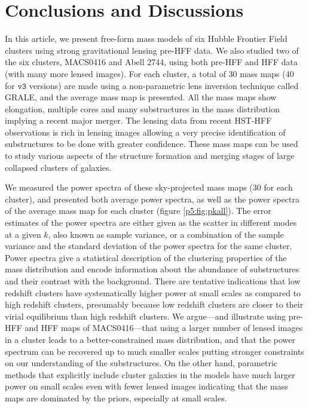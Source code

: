 \documentclass[
  11pt,
  twoside,
  openright,
  titlepage,
  headings=optiontoheadandtoc
]{scrbook}
\begin{document}

\section{Conclusions and Discussions}\label{p5:sec:discussion}

In this article, we present free-form mass models of six Hubble Frontier Field
clusters using strong gravitational lensing pre-HFF data.
We also studied two of the six clusters, MACS0416 and Abell 2744, using both pre-HFF
and HFF data (with many more lensed images).
For each cluster, a total of 30 mass maps (40 for $\mathtt{v3}$ versions) are made
using a non-parametric lens inversion technique called GRALE, and the
average mass map is presented. All the mass
maps show elongation, multiple cores and many substructures in the mass
distribution implying a recent major merger. The lensing data from
recent HST-HFF observations is rich in lensing images allowing a very
precise identification of substructures to be done with greater
confidence. These mass maps can be used to study various aspects
of the structure formation and merging stages of large collapsed clusters
of galaxies.

We measured the power spectra of these sky-projected mass maps (30 for each cluster),
and presented both average power spectra, as well as the power spectra of the
average mass map for each cluster (figure \ref{p5:fig:pkall}). The error
estimates of the power spectra are either given as the scatter in different modes
at a given $k$, also known as sample variance, or a combination of the sample
variance and the standard deviation of the power spectra for the same cluster.
Power spectra give a statistical description of the clustering properties of the
mass distribution and encode information about the abundance of
substructures  and their contrast with the background.
There are tentative indications that low redshift clusters
have systematically higher power at small scales as compared
to high redshift clusters, presumably because low redshift
clusters are closer to their virial equilibrium than high redshift clusters.
We argue---and illustrate using pre-HFF and HFF maps of MACS0416---that using a
larger number of lensed images in a cluster leads to a better-constrained mass
distribution, and that the power spectrum
can be recovered up to much smaller scales putting stronger constraints
on our understanding of the substructures. On the other hand, parametric
methods that explicitly include cluster galaxies in the models have much larger power on small scales
even with fewer lensed images indicating that the mass maps are dominated
by the priors, especially at small scales.
\end{document}
